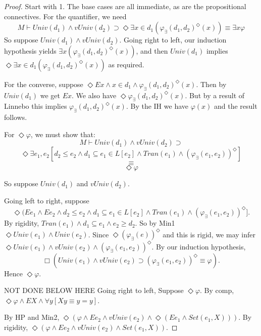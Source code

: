 \documentclass{article}
\begin{document}
    \begin{proof}
        Start with 1.
        The base cases are all immediate, as are the propositional connectives. 
        For the quantifier, we need 
        $$M \vdash Univ(d_1) \wedge vUniv(d_2) \supset 
        \Diamond \exists x \in d_1(\varphi_\exists(d_1, d_2)^\Diamond(x)) 
        \equiv 
        \exists x \varphi$$
        So suppose $Univ(d_1) \wedge vUniv(d_2)$. 
        Going right to left, our induction hypothesis 
        yields $\exists x (\varphi_\exists(d_1, d_2)^\Diamond(x))$, 
        and then $Univ(d_1)$ 
        implies $\Diamond \exists x \in d_1 (\varphi_\exists(d_1, d_2)^\Diamond(x))$ as 
        required. 
    
        For the converse, suppose 
        $\Diamond Ex \wedge x \in d_1 \wedge \varphi_\exists(d_1, d_2)^\Diamond(x)$.
        Then by $Univ(d_1)$ we get $Ex$. 
        We also have $\Diamond \varphi_\exists(d_1, d_2)^\Diamond(x)$.
        But by a result of Linnebo this implies $\varphi_\exists(d_1, d_2)^\Diamond(x)$.
        By the IH we have $\varphi(x)$ and the result follows.
    
        For $\Diamond \varphi$, we must show that:
        $$M \vdash Univ(d_1) \wedge vUniv(d_2) \supset $$
        $$\Diamond \exists e_1, e_2[d_2 \leq e_2 \wedge d_1 \subseteq e_1 \in L[e_2] \wedge Tran(e_1) \wedge (\varphi_\exists(e_1, e_2))^\Diamond]$$
        $$\equiv $$
        $$\Diamond \varphi$$
    
        So suppose $Univ(d_1)$ and $vUniv(d_2)$. 
        
        Going left to right, suppose
        $$\Diamond (Ee_1 \wedge Ee_2  \wedge d_2 \leq e_2 \wedge d_1 \subseteq e_1 \in L[e_2] \wedge Tran(e_1) \wedge (\varphi_\exists(e_1, e_2))^\Diamond].$$
        By rigidity, $Tran(e_1) \wedge d_1 \subseteq e_1 \wedge e_2 \geq d_2$. 
        So by Min1 $\Diamond Univ(e_1) \wedge Univ(e_2)$.
        Since
        $\Diamond (\varphi_\exists(e))^\Diamond$ and this is rigid, we may infer 
        $\Diamond Univ(e_1) \wedge vUniv(e_2) \wedge (\varphi_\exists(e_1, e_2))^\Diamond$.
        By our induction hypothesis, 
        $$\Box (Univ(e_1) \wedge vUniv(e_2) \supset (\varphi_\exists(e_1, e_2))^\Diamond \equiv \varphi).$$
        Hence $\Diamond \varphi$. 
        
        NOT DONE BELOW HERE
        Going right to left,
        Suppose $\Diamond \varphi$. By comp, 
        $\Diamond \varphi \wedge EX \wedge \forall y[Xy \equiv y = y]$.

        By HP and Min2, 
        $\Diamond (\varphi \wedge Ee_2 \wedge vUniv(e_2) \wedge \Diamond (Ee_1 \wedge Set(e_1, X)))$.
        By rigidity, $\Diamond (\varphi \wedge Ee_2 \wedge vUniv(e_2) \wedge Set(e_1, X))$.
    

\end{proof}
\end{document}
